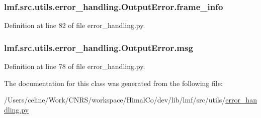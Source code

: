 \hypertarget{classlmf_1_1src_1_1utils_1_1error__handling_1_1_output_error_aa9cde9b3f989c8465f12e1b6e3b715bb}{
\subsubsection[{frame\+\_\+info}]{\setlength{\rightskip}{0pt plus 5cm}lmf.\+src.\+utils.\+error\+\_\+handling.\+Output\+Error.\+frame\+\_\+info}}\label{classlmf_1_1src_1_1utils_1_1error__handling_1_1_output_error_aa9cde9b3f989c8465f12e1b6e3b715bb}


Definition at line 82 of file error\+\_\+handling.\+py.

\hypertarget{classlmf_1_1src_1_1utils_1_1error__handling_1_1_output_error_a4bdad4fe4219a12ae88039ee8633c316}{
\subsubsection[{msg}]{\setlength{\rightskip}{0pt plus 5cm}lmf.\+src.\+utils.\+error\+\_\+handling.\+Output\+Error.\+msg}}\label{classlmf_1_1src_1_1utils_1_1error__handling_1_1_output_error_a4bdad4fe4219a12ae88039ee8633c316}


Definition at line 78 of file error\+\_\+handling.\+py.



The documentation for this class was generated from the following file\+:\begin{DoxyCompactItemize}
\item 
/\+Users/celine/\+Work/\+C\+N\+R\+S/workspace/\+Himal\+Co/dev/lib/lmf/src/utils/\hyperlink{error__handling_8py}{error\+\_\+handling.\+py}\end{DoxyCompactItemize}
